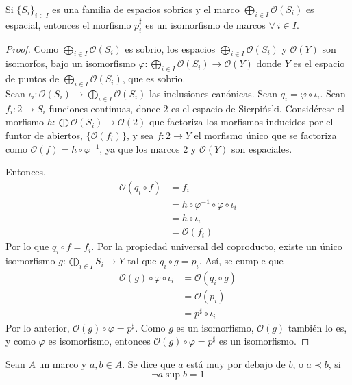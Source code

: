\begin{proposition}
Si $\{S_i\}_{i\in I}$ es una familia de espacios sobrios y el marco $\bigoplus\limits_{i\in I}\mathcal{O}(S_i)$ es espacial, entonces el morfismo $p_i^{\sharp}$ es un isomorfismo de marcos $\forall \ i \in I$.
\end{proposition}
\begin{proof}
Como $\bigoplus\limits_{i\in I}\mathcal{O}(S_i)$ es sobrio, los espacios $\bigoplus\limits_{i\in I}\mathcal{O}(S_i)$ y $\mathcal{O}(Y)$ son isomorfos, bajo un isomorfismo $\varphi:\bigoplus\limits_{i\in I}\mathcal{O}(S_i)\to\mathcal{O}(Y)$ donde  $Y$ es el espacio de puntos de $\bigoplus\limits_{i\in I}\mathcal{O}(S_i)$, que es sobrio.\\
Sean $\iota_i: \mathcal{O}(S_i)\to \bigoplus\limits_{i\in I}\mathcal{O}(S_i)$ las inclusiones canónicas. Sean $q_i=\varphi\circ\iota_i$. Sean $f_i:2\to S_i$ funciones continuas, donce $2$ es el espacio de Sierpi\'nski. Considérese el morfismo $h:\bigoplus\mathcal{O}(S_i)\to\mathcal{O}(2)$ que factoriza los morfismos inducidos por el funtor de abiertos, $\{\mathcal{O}(f_i)\}$, y sea $f:2\to Y$ el morfismo único que se factoriza como $\mathcal{O}(f)=h\circ\varphi^{-1}$, ya que los marcos $2$ y $\mathcal{O}(Y)$ son espaciales.

Entonces, \begin{align*}
    \mathcal{O}(q_i\circ f)&=f_i\\
    &=h\circ\varphi^{-1}\circ\varphi\circ\iota_i\\
    &=h\circ\iota_i\\
    &=\mathcal{O}(f_i)
\end{align*}
Por lo que $q_i\circ f=f_i$. Por la propiedad universal del coproducto, existe un único isomorfismo $g:\bigoplus\limits_{i\in I}S_i\to Y$ tal que $q_i\circ g=p_i$. Así, se cumple que 
\begin{align*}
    \mathcal{O}(g)\circ\varphi\circ\iota_i&=\mathcal{O}(q_i\circ g)\\
    &=\mathcal{O}(p_i)\\
    &=p^\sharp\circ\iota_i
\end{align*}
Por lo anterior, $\mathcal{O}(g)\circ\varphi=p^\sharp$. Como $g$ es un isomorfismo, $\mathcal{O}(g)$ también lo es, y como $\varphi$ es isomorfismo, entonces $\mathcal{O}(g)\circ\varphi=p^\sharp$ es un isomorfismo.
\end{proof}
\begin{definition}
    Sean $A$ un marco y $a,b\in A$. Se dice que $a$ está muy por debajo de $b$, o $a\prec b$, si 
    $$\neg a\sup b=1$$
\end{definition}
